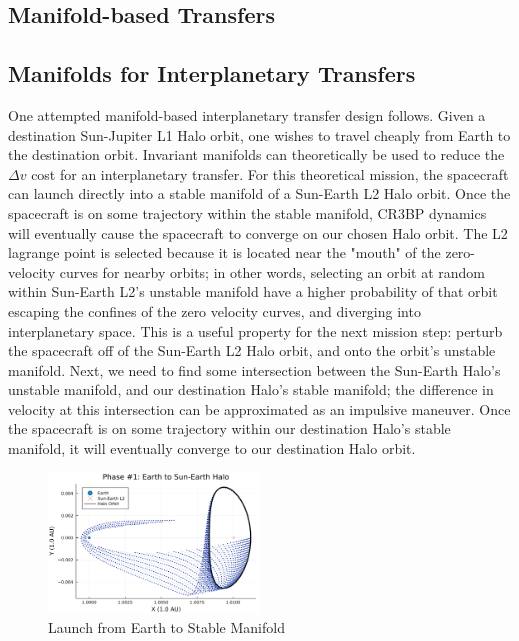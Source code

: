 \documentclass[conf]{new-aiaa}
\begin{document}
\begin{multicols}{2}
\section{Manifold-based Transfers}

\subsection{Manifolds for Interplanetary Transfers}
One attempted manifold-based interplanetary transfer design follows.
Given a destination Sun-Jupiter L1 Halo orbit, one wishes to travel cheaply
from Earth to the destination orbit. Invariant manifolds can theoretically 
be used to reduce the $\Delta v$ cost for an interplanetary transfer.
For this theoretical mission, the spacecraft can launch directly 
into a stable manifold of a Sun-Earth L2 Halo orbit. Once the 
spacecraft is on some trajectory within the stable manifold, 
CR3BP dynamics will eventually cause the spacecraft to converge
on our chosen Halo orbit. The L2 lagrange point is selected because 
it is located near the "mouth"
of the zero-velocity curves for nearby orbits; in other words, 
selecting an orbit at random within Sun-Earth L2's unstable manifold 
have a higher probability of that orbit 
escaping the confines of the zero 
velocity curves, and diverging into interplanetary space. This is a useful 
property for the next mission step: perturb the spacecraft off of the Sun-Earth 
L2 Halo orbit, and onto the orbit's unstable manifold. Next, we need to find 
some intersection between the Sun-Earth Halo's unstable manifold, and 
our destination Halo's stable manifold; the difference in velocity at this 
intersection can be approximated as an impulsive maneuver. Once the spacecraft
is on some trajectory within our destination Halo's stable manifold,
it will eventually converge to our destination Halo orbit. 

\begin{figure}[H]
    \hskip -0.3cm
    \includegraphics[width=0.5\textwidth]{manifold_transfer_phase1.png}
    \caption{Launch from Earth to Stable Manifold}
\end{figure}


\end{multicols}
\end{document}
